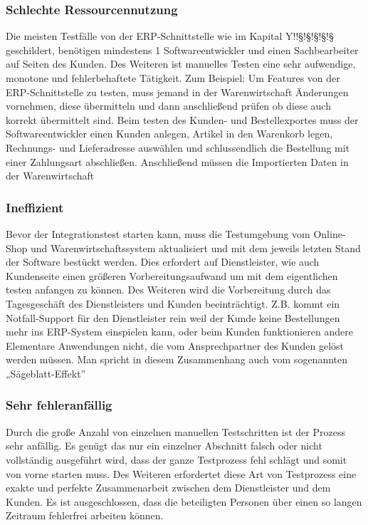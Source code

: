 \subsubsection{Schlechte Ressourcennutzung}
Die meisten Testfälle von der ERP-Schnittstelle wie im Kapital Y!!§!§!§!§!§ geschildert, benötigen mindestens 1 Softwareentwickler und einen Sachbearbeiter auf Seiten des Kunden. Des Weiteren ist manuelles Testen eine sehr aufwendige, monotone und fehlerbehaftete
Tätigkeit. Zum Beispiel: Um Features von der ERP-Schnittstelle zu testen, muss jemand in der Warenwirtschaft Änderungen vornehmen, diese übermitteln und dann anschließend prüfen ob diese auch korrekt übermittelt sind. Beim testen des Kunden- und Bestellexportes muss der Softwareentwickler einen Kunden anlegen, Artikel in den Warenkorb legen, Rechnungs- und Lieferadresse auswählen und schlussendlich die Bestellung mit einer Zahlungsart abschließen. Anschließend müssen die Importierten Daten in der Warenwirtschaft 	 

\subsubsection{Ineffizient}
Bevor der Integrationstest starten kann, muss die Testumgebung vom Online-Shop und Warenwirtschaftssystem aktualisiert und mit dem jeweils letzten Stand der Software bestückt werden. Dies erfordert auf Dienstleister, wie auch Kundenseite einen größeren 
Vorbereitungsaufwand um mit dem eigentlichen testen anfangen zu können. Des Weiteren wird die Vorbereitung durch das Tagesgeschäft des Dienstleisters und Kunden beeinträchtigt. Z.B. kommt ein Notfall-Support für den Dienstleister rein weil der Kunde keine Bestellungen mehr ins ERP-System einspielen kann, oder beim Kunden funktionieren andere Elementare Anwendungen nicht, die vom Ansprechpartner des Kunden gelöst werden müssen. Man spricht in diesem Zusammenhang auch vom sogenannten „Sägeblatt-Effekt”


\subsubsection{Sehr fehleranfällig}
Durch die große Anzahl von einzelnen manuellen Testschritten ist der Prozess sehr anfällig. Es genügt das nur ein einzelner Abschnitt falsch oder nicht vollständig ausgeführt wird, dass der ganze Testprozess fehl schlägt und somit von vorne starten muss. Des Weiteren erfordertet diese Art von Testprozess eine exakte und perfekte Zusammenarbeit zwischen dem Dienstleister und dem Kunden. Es ist ausgeschlossen, dass die beteiligten Personen über einen so langen Zeitraum fehlerfrei arbeiten können.


